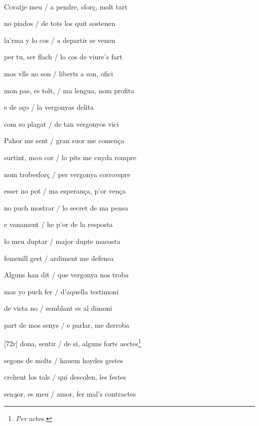 \documentclass[12pt]{article}
\renewcommand{\espaiAbansEtiquetaPoema}{\vspace{0ex}}
\begin{document}
\begin{estrofa}

\espaiAbansEtiquetaPoema

\\

\end{estrofa}


\begin{estrofa}

 C\textsc{o}ratje meu / a pendre, sfor\c{c}, molt tart

 no piados / de tots los quit sostenen

 la'rma y lo cos / a departir se venen

 per tu, ser flach / lo cos de viure's fart

 mos vlls no son / liberts a son, ofici

 mon pas, es tolt, / ma lengua, nom profita

 e de a\c{c}o / la vergonyas delita

 com so plagat / de tan vergonyos vici

\end{estrofa}



\begin{estrofa}

 Pahor me sent / gran suor me comen\c{c}a

 surtint, mo\textit{n} cor / lo pits me cuyda rompre

 nom trobesfor\c{c} / per vergonya corro\textit{m}pre

 esser no pot / ma esperan\c{c}a, p'or ven\c{c}a

 no puch mostrar / lo secret de ma pensa

 e vanament / he p'or de la resposta

 lo meu duptar / major dupte macosta

 femenill gest / ardiment me defensa

\end{estrofa}



\begin{estrofa}

 Alguns han dit / que vergonya nos troba

 mas yo puch fer / d'aquella testimoni

 de vista no / semblant es al dimoni

 part de mos senys / e parlar, me derroba

 [72r] dona, sentir / de si, alguns forts aectes\footnote{\textit{Per }actes.}

 segons de molts / hauem hoydes gestes

 crehent los tals / qui descolen, les festes

 sen\textit{y}or, es meu / amor, fer mal's contractes

\end{estrofa}
\end{document}
